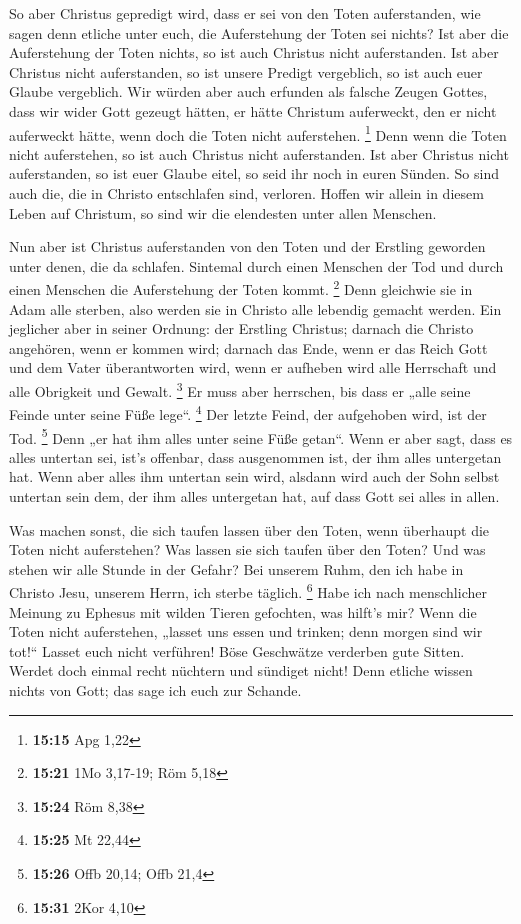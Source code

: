  So aber Christus gepredigt wird, dass er sei von den Toten
auferstanden, wie sagen denn etliche unter euch, die Auferstehung der
Toten sei nichts?  Ist aber die Auferstehung der Toten
nichts, so ist auch Christus nicht auferstanden.  Ist aber
Christus nicht auferstanden, so ist unsere Predigt vergeblich, so ist
auch euer Glaube vergeblich.  Wir würden aber auch erfunden
als falsche Zeugen Gottes, dass wir wider Gott gezeugt hätten, er hätte
Christum auferweckt, den er nicht auferweckt hätte, wenn doch die Toten
nicht auferstehen. \footnote{\textbf{15:15} Apg 1,22}  Denn
wenn die Toten nicht auferstehen, so ist auch Christus nicht
auferstanden.  Ist aber Christus nicht auferstanden, so ist
euer Glaube eitel, so seid ihr noch in euren Sünden.  So
sind auch die, die in Christo entschlafen sind, verloren. 
Hoffen wir allein in diesem Leben auf Christum, so sind wir die
elendesten unter allen Menschen.

 Nun aber ist Christus auferstanden von den Toten und der
Erstling geworden unter denen, die da schlafen.  Sintemal
durch einen Menschen der Tod und durch einen Menschen die Auferstehung
der Toten kommt. \footnote{\textbf{15:21} 1Mo 3,17-19; Röm 5,18}
 Denn gleichwie sie in Adam alle sterben, also werden sie
in Christo alle lebendig gemacht werden.  Ein jeglicher
aber in seiner Ordnung: der Erstling Christus; darnach die Christo
angehören, wenn er kommen wird;  darnach das Ende, wenn er
das Reich Gott und dem Vater überantworten wird, wenn er aufheben wird
alle Herrschaft und alle Obrigkeit und Gewalt. \footnote{\textbf{15:24}
  Röm 8,38}  Er muss aber herrschen, bis dass er „alle
seine Feinde unter seine Füße lege``. \footnote{\textbf{15:25} Mt 22,44}
 Der letzte Feind, der aufgehoben wird, ist der Tod.
\footnote{\textbf{15:26} Offb 20,14; Offb 21,4}  Denn „er
hat ihm alles unter seine Füße getan``. Wenn er aber sagt, dass es alles
untertan sei, ist's offenbar, dass ausgenommen ist, der ihm alles
untergetan hat.  Wenn aber alles ihm untertan sein wird,
alsdann wird auch der Sohn selbst untertan sein dem, der ihm alles
untergetan hat, auf dass Gott sei alles in allen.

 Was machen sonst, die sich taufen lassen über den Toten,
wenn überhaupt die Toten nicht auferstehen? Was lassen sie sich taufen
über den Toten?  Und was stehen wir alle Stunde in der
Gefahr?  Bei unserem Ruhm, den ich habe in Christo Jesu,
unserem Herrn, ich sterbe täglich. \footnote{\textbf{15:31} 2Kor 4,10}
 Habe ich nach menschlicher Meinung zu Ephesus mit wilden
Tieren gefochten, was hilft's mir? Wenn die Toten nicht auferstehen,
„lasset uns essen und trinken; denn morgen sind wir tot!{}``
 Lasset euch nicht verführen! Böse Geschwätze verderben
gute Sitten.  Werdet doch einmal recht nüchtern und
sündiget nicht! Denn etliche wissen nichts von Gott; das sage ich euch
zur Schande.

